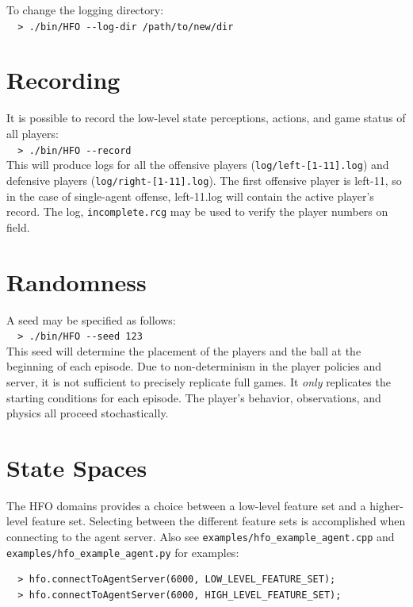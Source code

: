 \documentclass[12pt]{article}
\begin{document}
\noindent To change the logging directory:\\
\verb+  > ./bin/HFO --log-dir /path/to/new/dir +

\section{Recording}

It is possible to record the low-level state perceptions, actions, and
game status of all players:\\

\noindent \verb+  > ./bin/HFO --record + \\

This will produce logs for all the offensive players
(\verb+log/left-[1-11].log+) and defensive players
(\verb+log/right-[1-11].log+). The first offensive player is left-11,
so in the case of single-agent offense, left-11.log will contain the
active player's record. The log, \verb+incomplete.rcg+ may be used to
verify the player numbers on field.

\section{Randomness}

A seed may be specified as follows:\\

\noindent \verb+  > ./bin/HFO --seed 123+\\

This seed will determine the placement of the players and the ball at
the beginning of each episode. Due to non-determinism in the player
policies and server, it is not sufficient to precisely replicate full
games. It \textit{only} replicates the starting conditions for each
episode. The player's behavior, observations, and physics all proceed
stochastically.

\section{State Spaces}

The HFO domains provides a choice between a low-level feature set and
a higher-level feature set. Selecting between the different feature
sets is accomplished when connecting to the agent server. Also see
\verb|examples/hfo_example_agent.cpp| and
\verb|examples/hfo_example_agent.py| for examples:

\begin{verbatim}
  > hfo.connectToAgentServer(6000, LOW_LEVEL_FEATURE_SET);
  > hfo.connectToAgentServer(6000, HIGH_LEVEL_FEATURE_SET);
\end{verbatim}
\end{document}
